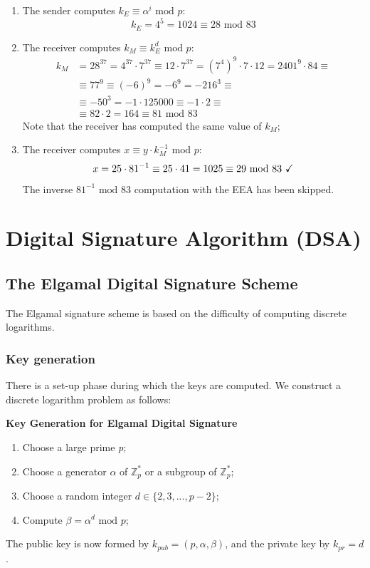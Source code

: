 \documentclass[11pt, a4paper]{article}
\newcommand{\mymod}{
    \text{ mod }
}
\begin{document}
\begin{enumerate}
    \item The sender computes $k_E\equiv\alpha^i\mymod p$:
    $$k_E=4^5=1024\equiv28\mymod83$$
    \item The receiver computes $k_M\equiv k_E^d\mymod p$:
    \begin{align*}
        k_M&=28^{37}=4^{37}\cdot7^{37}\equiv12\cdot7^{37}=\left(7^4\right)^9\cdot 7\cdot12=2401^9\cdot84\equiv\\
        &\equiv77^9\equiv\left(-6\right)^9=-6^9=-216^3\equiv\\
        &\equiv-50^3=-1\cdot125000\equiv -1\cdot 2\equiv\\
        &\equiv82\cdot2=164\equiv81\mymod83
    \end{align*}
    Note that the receiver has computed the same value of $k_M$;
    \item The receiver computes $x\equiv y\cdot k_M^{-1}\mymod p$:
    $$x=25\cdot81^{-1}\equiv25\cdot41=1025\equiv29\mymod83\text{ \checkmark}$$
    The inverse $81^{-1}\mymod83$ computation with the EEA has been skipped.
\end{enumerate}

\newpage
\section{Digital Signature Algorithm (DSA)}
\subsection{The Elgamal Digital Signature Scheme}
The Elgamal signature scheme is based on the difficulty of computing discrete logarithms.

\subsubsection{Key generation}
There is a set-up phase during which the keys are computed. We construct a discrete logarithm problem as follows:
\begin{framed}
    \hfill\break\textbf{Key Generation for Elgamal Digital Signature}
    \begin{enumerate}
        \item Choose a large prime \textit{p};
        \item Choose a generator $\alpha$ of $\mathbb{Z}_p^*$ or a subgroup of $\mathbb{Z}_p^*$;
        \item Choose a random integer $d\in\{2,3,...,p-2\}$;
        \item Compute $\beta=\alpha^d\mymod p$;
    \end{enumerate}
\end{framed}
The public key is now formed by $k_{pub}=(p,\alpha,\beta)$, and the private key by $k_{pr}=d$.
\end{document}
